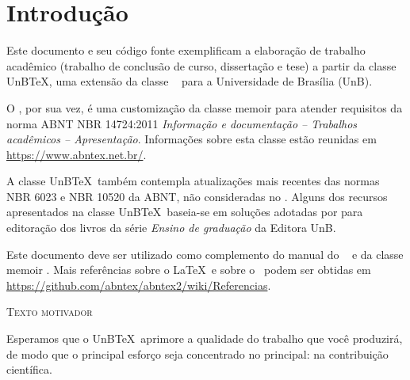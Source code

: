 \chapter{Introdução}
\label{cap:intr}

Este documento e seu código fonte exemplificam a elaboração de trabalho acadêmico (trabalho de conclusão de curso, dissertação e tese) a partir da classe UnB\TeX, uma extensão da classe \abnTeX\  \cite{Castro2019} para a Universidade de Brasília (UnB).


O \abnTeX, por sua vez, é uma customização da classe \textsf{memoir} para atender requisitos da norma ABNT NBR 14724:2011 \emph{Informação e documentação -- Trabalhos acadêmicos -- Apresentação}. Informações sobre esta classe estão reunidas em \url{https://www.abntex.net.br/}.


A classe UnB\TeX\ também contempla atualizações mais recentes das normas NBR 6023 \cite{NBR6023:2018} e NBR 10520 \cite{NBR10520:2023} da ABNT, não consideradas no \abnTeX. Alguns dos recursos apresentados na classe UnB\TeX\ baseia-se em soluções adotadas por  para editoração dos livros da série \emph{Ensino de graduação} da Editora UnB.

Este documento deve ser utilizado como complemento do manual do \abnTeX\ \cite{abntex2classe} e da classe \textsf{memoir} \cite{memoir}. Mais referências sobre o \LaTeX\ e sobre o \abnTeX\ podem ser obtidas em \url{https://github.com/abntex/abntex2/wiki/Referencias}.

\begin{mdframed}[style=plainSty,innertopmargin=8pt] %
{\center \textsc{Texto motivador} \par}
\noindent Esperamos que o UnB\TeX\ aprimore a qualidade do trabalho que você produzirá, de modo que o principal esforço seja concentrado no principal: na contribuição científica.
\end{mdframed}